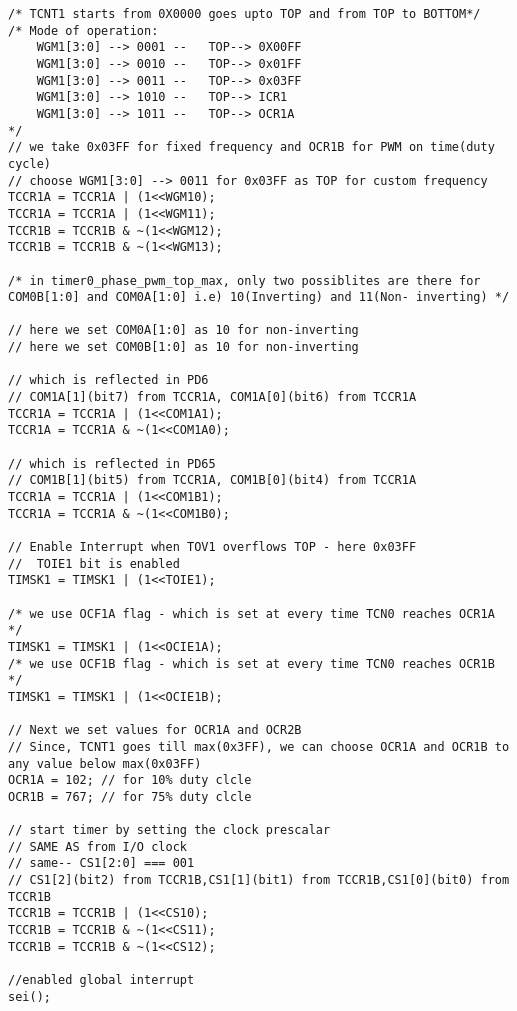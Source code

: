 \begin{verbatim}
/* TCNT1 starts from 0X0000 goes upto TOP and from TOP to BOTTOM*/
/* Mode of operation:
    WGM1[3:0] --> 0001 --	TOP--> 0X00FF
    WGM1[3:0] --> 0010 --	TOP--> 0x01FF
    WGM1[3:0] --> 0011 --	TOP--> 0x03FF
    WGM1[3:0] --> 1010 --	TOP--> ICR1
    WGM1[3:0] --> 1011 --	TOP--> OCR1A
*/	
// we take 0x03FF for fixed frequency and OCR1B for PWM on time(duty cycle)	
// choose WGM1[3:0] --> 0011 for 0x03FF as TOP for custom frequency
TCCR1A = TCCR1A | (1<<WGM10);
TCCR1A = TCCR1A | (1<<WGM11);
TCCR1B = TCCR1B & ~(1<<WGM12);
TCCR1B = TCCR1B & ~(1<<WGM13);

/* in timer0_phase_pwm_top_max, only two possiblites are there for COM0B[1:0] and COM0A[1:0] i.e) 10(Inverting) and 11(Non- inverting) */

// here we set COM0A[1:0] as 10 for non-inverting
// here we set COM0B[1:0] as 10 for non-inverting

// which is reflected in PD6
// COM1A[1](bit7) from TCCR1A, COM1A[0](bit6) from TCCR1A
TCCR1A = TCCR1A | (1<<COM1A1);
TCCR1A = TCCR1A & ~(1<<COM1A0);

// which is reflected in PD65
// COM1B[1](bit5) from TCCR1A, COM1B[0](bit4) from TCCR1A	
TCCR1A = TCCR1A | (1<<COM1B1);
TCCR1A = TCCR1A & ~(1<<COM1B0);

// Enable Interrupt when TOV1 overflows TOP - here 0x03FF
//  TOIE1 bit is enabled
TIMSK1 = TIMSK1 | (1<<TOIE1);

/* we use OCF1A flag - which is set at every time TCN0 reaches OCR1A */
TIMSK1 = TIMSK1 | (1<<OCIE1A);
/* we use OCF1B flag - which is set at every time TCN0 reaches OCR1B */
TIMSK1 = TIMSK1 | (1<<OCIE1B);

// Next we set values for OCR1A and OCR2B
// Since, TCNT1 goes till max(0x3FF), we can choose OCR1A and OCR1B to any value below max(0x03FF)
OCR1A = 102; // for 10% duty clcle
OCR1B = 767; // for 75% duty clcle

// start timer by setting the clock prescalar
// SAME AS from I/O clock
// same-- CS1[2:0] === 001
// CS1[2](bit2) from TCCR1B,CS1[1](bit1) from TCCR1B,CS1[0](bit0) from TCCR1B
TCCR1B = TCCR1B | (1<<CS10);
TCCR1B = TCCR1B & ~(1<<CS11);
TCCR1B = TCCR1B & ~(1<<CS12);

//enabled global interrupt
sei();
\end{verbatim}

